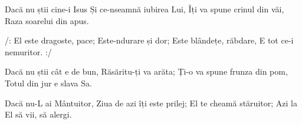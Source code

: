 
\beginverse
Dacă nu știi cine-i Isus
Și ce-nseamnă iubirea Lui,
Îți va spune crinul din văi,
Raza soarelui din apus.
\endverse

\beginchorus
/: El este dragoste, pace;
Este-ndurare și dor;
Este blândețe, răbdare,
E tot ce-i nemuritor. :/
\endchorus

\beginverse
Dacă nu știi cât e de bun,
Răsăritu-ți va arăta;
Ți-o va spune frunza din pom,
Totul din jur e slava Sa.
\endverse

\beginverse
Dacă nu-L ai Mântuitor,
Ziua de azi îți este prilej;
El te cheamă stăruitor;
Azi la El să vii, să alergi.
\endverse

\endsong
